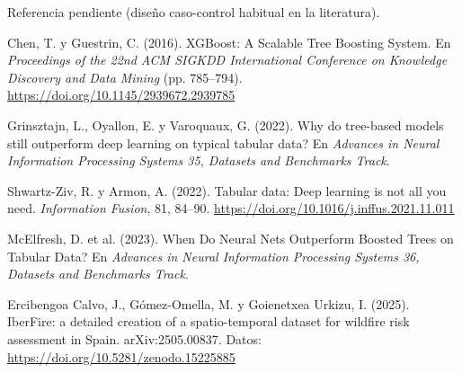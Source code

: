 \documentclass[10pt,a4paper]{article}
\begin{document}
\begin{enumerate}[label={[\arabic*]}, leftmargin=2.2em, itemsep=2pt]
  \small
  \item Referencia pendiente (diseño caso-control habitual en la literatura).
  \item Chen, T. y Guestrin, C. (2016). XGBoost: A Scalable Tree Boosting System. En \emph{Proceedings of the 22nd ACM SIGKDD International Conference on Knowledge Discovery and Data Mining} (pp. 785--794). \url{https://doi.org/10.1145/2939672.2939785}
  \item Grinsztajn, L., Oyallon, E. y Varoquaux, G. (2022). Why do tree-based models still outperform deep learning on typical tabular data? En \emph{Advances in Neural Information Processing Systems 35, Datasets and Benchmarks Track}.
  \item Shwartz-Ziv, R. y Armon, A. (2022). Tabular data: Deep learning is not all you need. \emph{Information Fusion}, 81, 84--90. \url{https://doi.org/10.1016/j.inffus.2021.11.011}
  \item McElfresh, D. et al. (2023). When Do Neural Nets Outperform Boosted Trees on Tabular Data? En \emph{Advances in Neural Information Processing Systems 36, Datasets and Benchmarks Track}.
  \item Ercibengoa Calvo, J., Gómez-Omella, M. y Goienetxea Urkizu, I. (2025). IberFire: a detailed creation of a spatio-temporal dataset for wildfire risk assessment in Spain. arXiv:2505.00837. Datos: \url{https://doi.org/10.5281/zenodo.15225885}
\end{enumerate}
\end{document}
